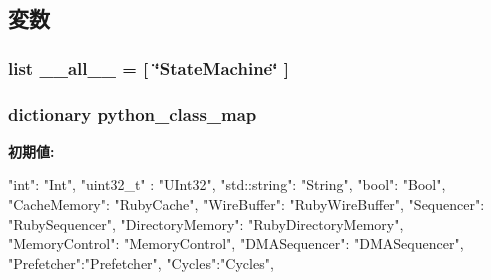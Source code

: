 \subsection{変数}
\hypertarget{namespaceslicc_1_1symbols_1_1StateMachine_aa4a022e6ddacd362b83964da5cc5d044}{
\subsubsection[{\_\-\_\-all\_\-\_\-}]{\setlength{\rightskip}{0pt plus 5cm}list {\bf \_\-\_\-all\_\-\_\-} = \mbox{[} \char`\"{}StateMachine\char`\"{} \mbox{]}}}
\label{namespaceslicc_1_1symbols_1_1StateMachine_aa4a022e6ddacd362b83964da5cc5d044}
\hypertarget{namespaceslicc_1_1symbols_1_1StateMachine_a243d8449d9b3ab1e85f865bc15d42ad7}{
\subsubsection[{python\_\-class\_\-map}]{\setlength{\rightskip}{0pt plus 5cm}dictionary {\bf python\_\-class\_\-map}}}
\label{namespaceslicc_1_1symbols_1_1StateMachine_a243d8449d9b3ab1e85f865bc15d42ad7}
{\bfseries 初期値:}
\begin{DoxyCode}
{
                    "int": "Int",
                    "uint32_t" : "UInt32",
                    "std::string": "String",
                    "bool": "Bool",
                    "CacheMemory": "RubyCache",
                    "WireBuffer": "RubyWireBuffer",
                    "Sequencer": "RubySequencer",
                    "DirectoryMemory": "RubyDirectoryMemory",
                    "MemoryControl": "MemoryControl",
                    "DMASequencer": "DMASequencer",
                    "Prefetcher":"Prefetcher",
                    "Cycles":"Cycles",
                   }
\end{DoxyCode}
